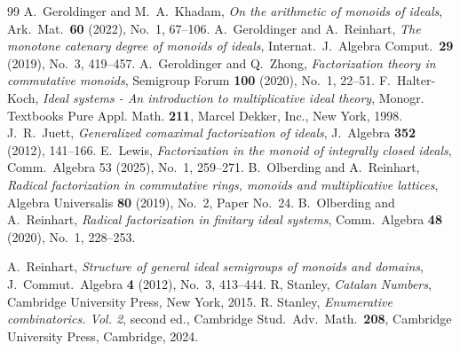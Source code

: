 \documentclass[a4paper,10pt,reqno]{amsart}
\theoremstyle{definition}
\theoremstyle{definition}
\begin{document}
\begin{thebibliography}{99}
%
 A.~Geroldinger and M.~A.~Khadam, \emph{On the arithmetic of monoids of ideals}, Ark.~Mat.~\textbf{60} (2022), No.~1, 67--106.
%
A.~Geroldinger and A.~Reinhart, \emph{The monotone catenary degree of monoids of ideals}, Internat.~J.~Algebra Comput.~\textbf{29} (2019), No.~3, 419--457.
%
A.~Geroldinger and Q.~Zhong, \emph{Factorization theory in commutative monoids}, Semigroup Forum \textbf{100} (2020), No.~1, 22--51.
%
 F.~Halter-Koch, \emph{Ideal systems - An introduction to multiplicative ideal theory}, Monogr. Textbooks Pure Appl. Math. \textbf{211}, Marcel Dekker, Inc., New York, 1998.
%
 J.~R.~Juett, \emph{Generalized comaximal factorization of ideals}, J.~Algebra \textbf{352} (2012), 141--166.
%
 E.~Lewis, \emph{Factorization in the monoid of integrally closed ideals}, Comm.~Algebra 53 (2025), No.~1, 259--271.
%
 B.~Olberding and A.~Reinhart, \emph{Radical factorization in commutative rings, monoids and multiplicative lattices}, Algebra Universalis \textbf{80} (2019), No.~2, Paper No.~24.
%
 B.~Olberding and A.~Reinhart, \emph{Radical factorization in finitary ideal systems}, Comm.~Algebra \textbf{48} (2020), No.~1, 228--253.

   A.~Reinhart, \emph{Structure of general ideal semigroups of monoids and domains}, J.~Commut.~Algebra \textbf{4} (2012), No.~3, 413--444.
%
   R, Stanley, \emph{Catalan Numbers}, Cambridge University Press, New York, 2015.
%
   R. Stanley, \emph{Enumerative combinatorics. Vol. 2}, second ed., Cambridge Stud.~Adv.~Math.~\textbf{208}, Cambridge University Press, Cambridge, 2024.
\end{thebibliography}
\end{document}
